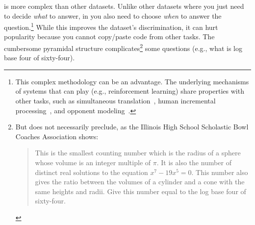 \qb{} is more complex than other datasets.  
Unlike other datasets where you just need to decide \emph{what} to
answer, in \qb{} you also need to choose \emph{when} to answer the
question.\footnote{This complex methodology can be an advantage.  The
  underlying mechanisms of systems that can play \qb{} (e.g.,
  reinforcement learning) share properties with other tasks, such as
  simultaneous
  translation~\citep{grissom:he:boyd-graber:morgan-2014,ma-etal-2019-stacl},
  human incremental processing~\citep{levy-08,levy-11}, and opponent
  modeling~\citep{he-16}.}
While this improves the dataset's discrimination, it can hurt
popularity because you cannot copy/paste code from other 
tasks.
The cumbersome pyramidal structure complicates\footnote{But does not
  necessarily preclude, as the Illinois High School
  Scholastic Bowl Coaches Association shows:
\begin{quote}
    This is the smallest counting number which is the radius of a sphere whose volume is an integer multiple of $\pi$. It is also the number of distinct real solutions to the equation $x^7-19x^5=0$. This number also gives the ratio between the volumes of a cylinder and a cone with the same heights and radii. Give this number equal to the log base four of sixty-four.
\end{quote}} some questions (e.g.,
what is log base four of sixty-four).



